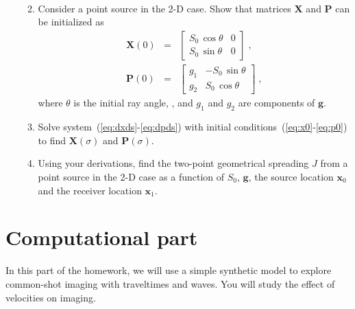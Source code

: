 \begin{enumerate}
\begin{enumerate}
\begin{eqnarray}
    \label{eq:dpds}
  \end{eqnarray}
\item Consider a point source in the 2-D case. Show that matrices
  $\mathbf{X}$ and $\mathbf{P}$ can be initialized as
  \begin{eqnarray}
    \label{eq:x0}
    \mathbf{X}(0) & = & \left[\begin{array}{cc} 
        S_0\,\cos{\theta} & 0 \\
        S_0\,\sin{\theta} & 0 \end{array}\right]\;, \\
    \label{eq:p0}
    \mathbf{P}(0) & = & \left[\begin{array}{cc} 
        g_1 & -S_0\,\sin{\theta} \\
        g_2 & S_0\,\cos{\theta} \end{array}\right]\;, 
  \end{eqnarray}
  where $\theta$ is the initial ray angle, , and $g_1$ and $g_2$ are
  components of $\mathbf{g}$.
\item Solve system~(\ref{eq:dxds}-\ref{eq:dpds}) with initial
  conditions~(\ref{eq:x0}-\ref{eq:p0}) to find $\mathbf{X}(\sigma)$
  and $\mathbf{P}(\sigma)$.
\item Using your derivations, find the two-point geometrical spreading
  $J$ from a point source in the 2-D case as a function of $S_0$,
  $\mathbf{g}$, the source location $\mathbf{x}_0$ and the receiver
  location $\mathbf{x}_1$.
\end{enumerate}

\end{enumerate}

\section{Computational part}

In this part of the homework, we will use a simple synthetic model to
explore common-shot imaging with traveltimes and waves. You will study
the effect of velocities on imaging.

